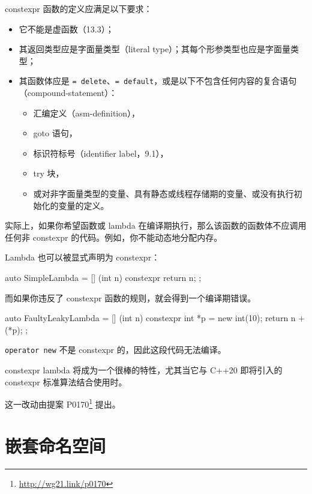 \begin{myQuote}
constexpr 函数的定义应满足以下要求：

\begin{itemize}
\item 它不能是虚函数（13.3）；
\item 其返回类型应是字面量类型（literal type）；其每个形参类型也应是字面量类型；
\item 其函数体应是 \texttt{= delete}、\texttt{= default}，或是以下不包含任何内容的复合语句（compound-statement）：
  \begin{itemize}
  \item 汇编定义（asm-definition），
  \item goto 语句，
  \item 标识符标号（identifier label，9.1），
  \item try 块，
  \item 或对非字面量类型的变量、具有静态或线程存储期的变量、或没有执行初始化的变量的定义。
  \end{itemize}
\end{itemize}
\end{myQuote}

实际上，如果你希望函数或 lambda 在编译期执行，那么该函数的函数体不应调用任何非 constexpr 的代码。例如，你不能动态地分配内存。

Lambda 也可以被显式声明为 constexpr：

\begin{codebox}[cpp]
auto SimpleLambda = [] (int n) constexpr { return n; };
\end{codebox}

而如果你违反了 constexpr 函数的规则，就会得到一个编译期错误。

\begin{codebox}[cpp]
auto FaultyLeakyLambda = [] (int n) constexpr {
int *p = new int(10);
return n + (*p);
};
\end{codebox}

\texttt{operator new} 不是 constexpr 的，因此这段代码无法编译。

constexpr lambda 将成为一个很棒的特性，尤其当它与 C++20 即将引入的 constexpr 标准算法结合使用时。

\begin{myInfoBox}
这一改动由提案 P0170\footnote{\url{http://wg21.link/p0170}} 提出。
\end{myInfoBox}

\section{嵌套命名空间}

